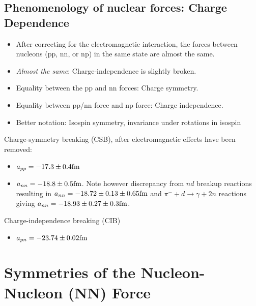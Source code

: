 \documentclass[graybox,sectrefs,envcountresetchap,open=right]{svmonodo}
\begin{document}
\subsection{Phenomenology of nuclear forces: Charge Dependence}


\begin{itemize}
 \item After correcting for the electromagnetic interaction, the forces between nucleons (pp, nn, or np) in the same state are almost the same.

 \item \emph{Almost the same}: Charge-independence is slightly broken.

 \item Equality between the pp and nn forces: Charge symmetry.

 \item Equality between pp/nn force and np force: Charge independence.

 \item Better notation: Isospin symmetry, invariance under rotations in isospin
\end{itemize}

\noindent
Charge-symmetry breaking (CSB), after electromagnetic effects
have been removed:
\begin{itemize}
\item $a_{pp}=  -17.3 \pm 0.4 \hspace{0.cm} \mathrm{fm}$

\item $a_{nn}=-18.8 \pm 0.5 \hspace{0.cm} \mathrm{fm}$. Note however discrepancy from $nd$ breakup reactions resulting in  $a_{nn}=-18.72 \pm 0.13 \pm 0.65 \hspace{0.cm} \mathrm{fm}$ and $\pi^- + d \rightarrow \gamma + 2n$ reactions giving  $a_{nn}=-18.93 \pm 0.27 \pm 0.3 \hspace{0.cm} \mathrm{fm}$.
\end{itemize}

\noindent
Charge-independence breaking (CIB)
\begin{itemize}
\item $a_{pn}=  -23.74 \pm 0.02 \hspace{0.cm} \mathrm{fm}$ 
\end{itemize}

\noindent
\section{Symmetries of the Nucleon-Nucleon (NN) Force}
\end{document}
